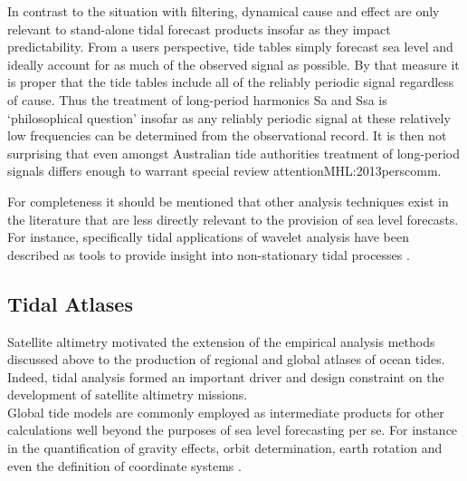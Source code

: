In contrast to the situation with filtering, dynamical cause and effect are only relevant to stand-alone tidal forecast products insofar as they impact predictability.  From a users perspective, tide tables simply forecast sea level and ideally account for as much of the observed signal as possible.   By that measure it is proper that the tide tables include all of the reliably periodic signal regardless of cause.   
Thus the treatment of long-period harmonics Sa and Ssa is `philosophical question' \citep{Parker:2007wq} insofar as any reliably periodic signal at these relatively low frequencies can be determined from the observational record.  It is then not surprising that even amongst Australian tide authorities treatment of long-period signals differs enough to warrant special review attention{MHL:2013perscomm}.




For completeness it should be mentioned that other analysis techniques exist in the literature that are less directly relevant to the provision of sea level forecasts.\\
For instance, specifically tidal applications of wavelet analysis have been described as tools to provide insight into non-stationary tidal processes \citep{Flinchem:2000kp}.





\subsection{Tidal Atlases}

Satellite altimetry motivated the extension of the empirical analysis methods discussed above to the production of regional and global atlases of ocean tides.  Indeed, tidal analysis formed an important driver and design constraint on the development of satellite altimetry missions.\\
Global tide models are commonly employed as intermediate products for other calculations well beyond the purposes of sea level forecasting per se.  For instance in the quantification of gravity effects, orbit determination, earth rotation and even the definition of coordinate systems \citep{Anonymous:2004tm}.\\



